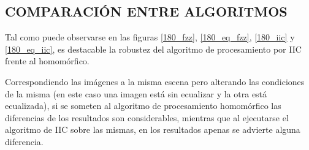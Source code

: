 \subsection{COMPARACIÓN ENTRE ALGORITMOS}
Tal como puede observarse en las figuras \ref{180_fzz}, \ref{180_eq_fzz}, \ref{180_iic} y \ref{180_eq_iic}, es destacable la robustez del algoritmo de procesamiento por IIC frente al homomórfico. 

Correspondiendo las imágenes a la misma escena pero alterando las condiciones de la misma (en este caso una imagen está sin ecualizar y la otra está ecualizada), si se someten al algoritmo de procesamiento homomórfico las diferencias de los resultados son considerables, mientras que al ejecutarse el algoritmo de IIC sobre las mismas, en los resultados apenas se advierte alguna diferencia.